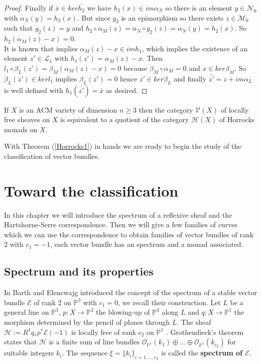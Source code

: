 \documentclass[
	oldfontcommands,
	sumario=abnt-6027-2012,
	12pt,			%
	openright,		%
	oneside,		%
	a4paper,		%
	english,		%
	brazil			%
	]{imecc-unicamp}
\begin{document}
\begin{proof}
Finally if $\bar{x} \in ker \bar{h_2}$ we have $h_2(x) \in im \alpha_N$ so there is an element $y \in \mathcal{N}_0$ with $\alpha_N(y)=h_2(x)$. But since $g_2$ is an epimorphism so there exists $ z \in \mathcal{M}_0$ such that $g_2(z)=y$ and $h_2 \circ \alpha_M(z)=\alpha_N \circ g_2(z)=\alpha_N(y)=h_2(x)$. So $h_2(\alpha_M(z)-x)=0$. \\ It is known \cite[MacLane, Theorem 3 (vi), p.201]{maclane} that implies $\alpha_M(z)-x \in im h_1$, which implies the existence of an element $z' \in \mathcal{L}_1$ with $h_1(z')=\alpha_M(z)-x$. Then $l_1 \circ \beta_L(z') =\beta_M(\alpha_M(z)-x)=0$ because $\beta_M \circ \alpha_M=0$ and $x \in ker \beta_M$. So $\beta_L(z') \in ker l_1$ implies $ \beta_L(z')=0$ hence $z' \in ker \beta_L$ and finally $\bar{z'}=z+im \alpha_L$ is well defined with $h_1(\bar{z'})=\bar{x}$ as desired.
\end{proof}
\begin{corollary}
If $X$ is an ACM variety of dimension $n \geq 3$ then the category $\mathcal{V}(X)$ of locally free sheaves on $X$ is equivalent to a quotient of the category $\mathcal{H}(X)$ of Horrocks monads on $X$.
\end{corollary}
With Theorem (\ref{Horrocks1}) in hands we are ready to begin the study of the classification of vector bundles.
\chapter{Toward the classification}
In this chapter we will introduce the spectrum of a reflexive sheaf and the Hartshorne-Serre correspondence. Then we will give a few families of curves which we can use the correspondence to obtain families of vector bundles of rank 2 with $c_1=-1$, each vector bundle has an spectrum and a monad associated.
\section{Spectrum and its properties}
In \cite[Barth \& Elencwajg]{10.1007/BFb0063170} Barth and Elencwajg introduced the concept of the spectrum of a stable vector bundle $\mathcal{E}$ of rank 2 on $\mathbb{P}^3$ with $c_1=0$, we recall their construction. Let $L$ be a general line on $\mathbb{P}^3$, $p:X \to \mathbb{P}^3$ the blowing-up of $\mathbb{P}^3$ along $L$ and $q:X \to \mathbb{P}^1$ the morphism determined by the pencil of planes through $L$. The sheaf $\mathcal{H}:=R^1q_*p^*\mathcal{E}(-1)$ is locally free of rank $c_2$ on $\mathbb{P}^1$ \cite[Barth \& Elencwajg, Proposition 2.2.1 p.9]{10.1007/BFb0063170}. Grothendieck's theorem states that $\mathcal{H}$ is a finite sum of line bundles $\mathcal{O}_{\mathbb{P}^1}(k_1) \oplus ... \oplus \mathcal{O}_{\mathbb{P}^1}(k_{c_2})$ for suitable integers $k_i$. The sequence $\xi = \{k_i\}_{i=1,...,c_2}$ is called the \textbf{spectrum of $\mathcal{E}$}.
\end{document}
